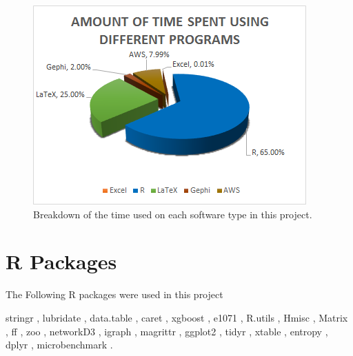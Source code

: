 \begin{figure}
    \centering
    \includegraphics[width = \textwidth]{Figures/Appendix/SoftwareType}
    \caption[Software use]{Breakdown of the time used on each software type in this project.}
    \label{fig:SofwareType}
\end{figure}


\section{R Packages}
\label{sec:packages}
The Following R packages were used in this project

stringr \cite{wickham2015}, lubridate \cite{grolemund2011}, data.table \cite{dowle2015}, caret \cite{fromjedwing2016}, xgboost \cite{chen2016}, e1071 \cite{meyer2015}, R.utils \cite{bengtsson2016}, Hmisc \cite{harrelljr2016}, Matrix \cite{bates2016}, ff \cite{adler2014}, zoo \cite{zeileis2005}, networkD3 \cite{gandrud2016}, igraph \cite{csardi2006} \cite{csrdi2006}, magrittr \cite{bache2014}, ggplot2 \cite{wickham2009}, tidyr \cite{wickham2016}, xtable \cite{dahl2016}, entropy \cite{hausser2014}, dplyr \cite{wickham2016a}, microbenchmark \cite{mersmann2015}.


